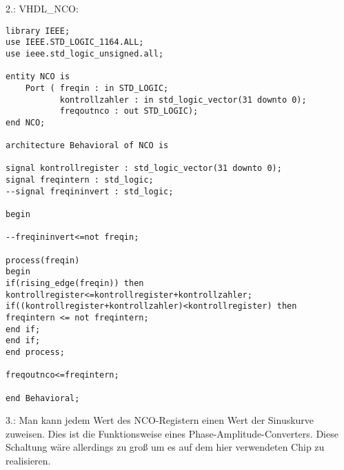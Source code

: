 \documentclass{article}
\begin{document}
2.:\newline
VHDL\_NCO:\newline
\begin{verbatim}
library IEEE;
use IEEE.STD_LOGIC_1164.ALL;
use ieee.std_logic_unsigned.all;

entity NCO is
    Port ( freqin : in STD_LOGIC;
           kontrollzahler : in std_logic_vector(31 downto 0);
           freqoutnco : out STD_LOGIC);
end NCO;

architecture Behavioral of NCO is

signal kontrollregister : std_logic_vector(31 downto 0);
signal freqintern : std_logic;
--signal freqininvert : std_logic;

begin

--freqininvert<=not freqin;

process(freqin)
begin
if(rising_edge(freqin)) then
kontrollregister<=kontrollregister+kontrollzahler;
if((kontrollregister+kontrollzahler)<kontrollregister) then
freqintern <= not freqintern;
end if;
end if;
end process;

freqoutnco<=freqintern;

end Behavioral;
\end{verbatim}

3.:\newline
Man kann jedem Wert des NCO-Registern einen Wert der Sinuskurve zuweisen. Dies ist die Funktionsweise eines Phase-Amplitude-Converters. Diese Schaltung w\"are allerdings zu gro{\ss} um es auf dem hier verwendeten Chip zu realisieren.
\end{document}
